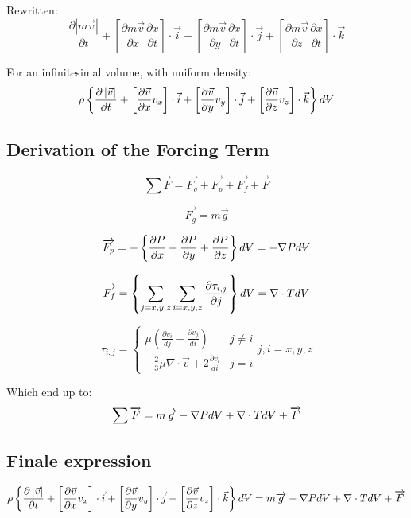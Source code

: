 \documentclass[twocolumn]{article}
\numberwithin{equation}{section}
\begin{document}
Rewritten:
\[\frac{{\partial \left| {m\overrightarrow v } \right|}}{{\partial t}} + \left[ {\frac{{\partial m\overrightarrow v }}{{\partial x}}\frac{{\partial x}}{{\partial t}}} \right] \cdot \overrightarrow i  + \left[ {\frac{{\partial m\overrightarrow v }}{{\partial y}}\frac{{\partial x}}{{\partial t}}} \right] \cdot \overrightarrow j  + \left[ {\frac{{\partial m\overrightarrow v }}{{\partial z}}\frac{{\partial x}}{{\partial t}}} \right] \cdot \overrightarrow k \]

For an infinitesimal volume, with uniform density:
\[\rho \left\{ {\frac{{\partial \left| {\vec v} \right|}}{{\partial t}} + \left[ {\frac{{\partial \vec v}}{{\partial x}}{v_x}} \right] \cdot \vec i + \left[ {\frac{{\partial \vec v}}{{\partial y}}{v_y}} \right] \cdot \vec j + \left[ {\frac{{\partial \vec v}}{{\partial z}}{v_z}} \right] \cdot \vec k} \right\}d\rlap{--} V\]


\subsection{Derivation of the Forcing Term}
\[\sum {\overrightarrow F }  = \overrightarrow {{F_g}}  + \overrightarrow {{F_p}}  + \overrightarrow {{F_f}} + \overrightarrow F \]

\[\overrightarrow {{F_g}}  = m\overrightarrow g \]

\[\overrightarrow {{F_p}}  =  - \left\{ {\frac{{\partial P}}{{\partial x}} + \frac{{\partial P}}{{\partial y}} + \frac{{\partial P}}{{\partial z}}} \right\}d\rlap{--} V =  - \nabla Pd\rlap{--} V\]

\[\overrightarrow {{F_f}}  = \left\{ {\sum\limits_{j = x,y,z}^{} {\sum\limits_{i = x,y,z}^{} {\frac{{\partial {\tau _{i,j}}}}{{\partial j}}} } } \right\}d\rlap{--} V = \nabla  \cdot Td\rlap{--} V\]

\[{\tau _{i,j}} = \left\{ {\begin{array}{*{20}{c}}
{\mu \left( {\frac{{\partial {v_i}}}{{dj}} + \frac{{\partial {v_j}}}{{di}}} \right)}&{j \ne i}\\
{ - \frac{2}{3}\mu \nabla  \cdot \overrightarrow v  + 2\frac{{\partial {v_i}}}{{di}}}&{j = i}
\end{array}} \right.j,i = x,y,z\]


Which end up to:
\[\sum {\overrightarrow F }  =  m\overrightarrow g  - \nabla Pd\rlap{--} V + \nabla  \cdot Td\rlap{--} V + \overrightarrow F \]

\subsection{Finale expression}
\[\rho \left\{ {\frac{{\partial \left| {\vec v} \right|}}{{\partial t}} + \left[ {\frac{{\partial \vec v}}{{\partial x}}{v_x}} \right] \cdot \vec i + \left[ {\frac{{\partial \vec v}}{{\partial y}}{v_y}} \right] \cdot \vec j + \left[ {\frac{{\partial \vec v}}{{\partial z}}{v_z}} \right] \cdot \vec k} \right\}d\rlap{--} V  =  m\overrightarrow g  - \nabla Pd\rlap{--} V + \nabla  \cdot Td\rlap{--} V + \overrightarrow F \]
\end{document}
